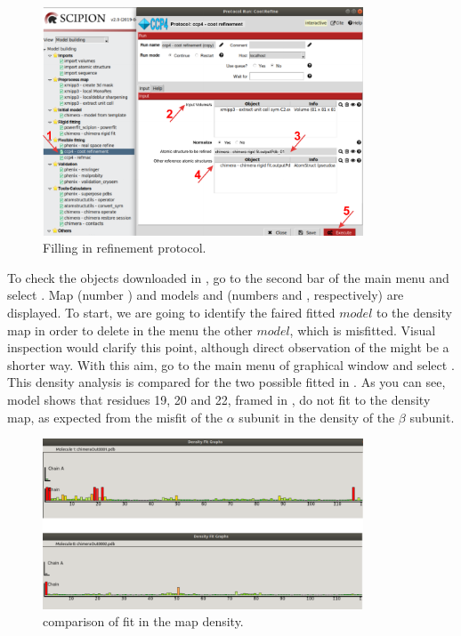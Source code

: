  \begin{figure}[H]
  \centering 
  \captionsetup{width=.7\linewidth} 
  \includegraphics[width=0.85\textwidth]{Images/Fig24}
  \caption{Filling in \coot refinement protocol.}
  \label{fig:coot_refinement_protocol}
  \end{figure}
  

  To check the objects downloaded in \coot, go to the second bar of the main menu and select . Map  (number ) and models  and  (numbers  and , respectively) are displayed. To start, we are going to identify the faired fitted $model$ to the density map in order to delete in the  menu the other $model$, which is misfitted. Visual inspection would clarify this point, although direct observation of the  might be a shorter way. With this aim, go to the main menu of \coot graphical window and select . This density analysis is compared for the two possible fitted  in . As you can see, model  shows that residues 19, 20 and 22, framed in , do not fit to the density map, as expected from the misfit of the $\alpha$ subunit in the density of the $\beta$ subunit.
 
 \begin{figure}[H]
  \centering 
  \captionsetup{width=.7\linewidth} 
  \includegraphics[width=0.85\textwidth]{Images/Fig25}
  \caption{\coot comparison of  fit in the map density.}
  \label{fig:coot_density_fit_analysis}
  \end{figure}
  
